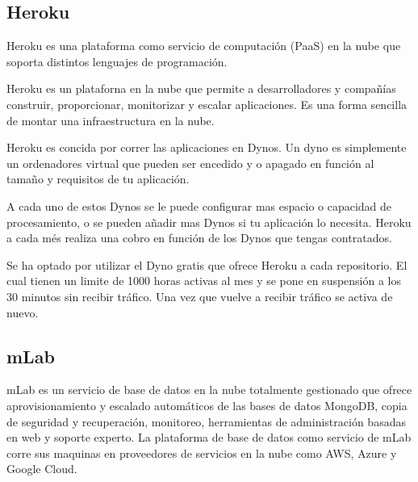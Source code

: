 


\subsection{ Heroku }


Heroku es una plataforma como servicio de computación (PaaS\cite{URL::PaaS}) en la nube que soporta distintos lenguajes de programación.

Heroku es un plataforna en la nube que permite a desarrolladores y compañías construir, proporcionar, monitorizar y escalar aplicaciones. Es una forma sencilla de montar una infraestructura en la nube.

Heroku es concida por correr las aplicaciones en Dynos. Un dyno es simplemente un ordenadores virtual que pueden ser encedido y o apagado en función al tamaño y requisitos de tu aplicación.

A cada uno de estos Dynos se le puede configurar mas espacio o capacidad de procesamiento, o se pueden añadir mas Dynos si tu aplicación lo necesita. Heroku a cada més realiza una cobro en función de los Dynos que tengas contratados. 

Se ha optado por utilizar el Dyno gratis que ofrece Heroku a cada repositorio. El cual tienen un limite de 1000 horas activas al mes y se pone en suspensión a los 30 minutos sin recibir tráfico. Una vez que vuelve a recibir tráfico se activa de nuevo.    




\subsection{ mLab }

mLab es un servicio de base de datos en la nube totalmente gestionado que ofrece aprovisionamiento y escalado automáticos de las bases de datos MongoDB, copia de seguridad y recuperación, monitoreo, herramientas de administración basadas en web y soporte experto. La plataforma de base de datos como servicio de mLab corre sus maquinas en proveedores de servicios en la nube como AWS\cite{URL::aws}, Azure\cite{URL::Azure} y Google Cloud\cite{URL::GoogleCloud}.

